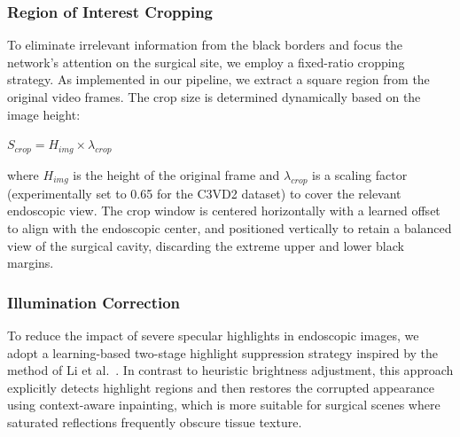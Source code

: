 \subsubsection{Region of Interest Cropping}
To eliminate irrelevant information from the black borders and focus the network's attention on the surgical site, we employ a fixed-ratio cropping strategy. As implemented in our pipeline, we extract a square region from the original video frames. The crop size is determined dynamically based on the image height:
\begin{center}
    $ S_{crop} = H_{img} \times \lambda_{crop} $
\end{center}
where $H_{img}$ is the height of the original frame and $\lambda_{crop}$ is a scaling factor (experimentally set to 0.65 for the C3VD2 dataset) to cover the relevant endoscopic view. The crop window is centered horizontally with a learned offset to align with the endoscopic center, and positioned vertically to retain a balanced view of the surgical cavity, discarding the extreme upper and lower black margins.

\subsubsection{Illumination Correction}
To reduce the impact of severe specular highlights in endoscopic images, we adopt a learning-based two-stage highlight suppression strategy inspired by the method of Li et al.~\cite{li2025twostagehighlight}. In contrast to heuristic brightness adjustment, this approach explicitly detects highlight regions and then restores the corrupted appearance using context-aware inpainting, which is more suitable for surgical scenes where saturated reflections frequently obscure tissue texture.

